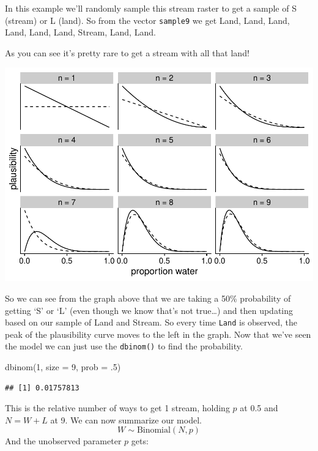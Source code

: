 \documentclass[
]{book}
\newenvironment{Shaded}{\begin{snugshade}}{\end{snugshade}}
\newcommand{\AttributeTok}[1]{\textcolor[rgb]{0.77,0.63,0.00}{#1}}
\newcommand{\DecValTok}[1]{\textcolor[rgb]{0.00,0.00,0.81}{#1}}
\newcommand{\FunctionTok}[1]{\textcolor[rgb]{0.00,0.00,0.00}{#1}}
\newcommand{\NormalTok}[1]{#1}
\begin{document}
In this example we'll randomly sample this stream raster to get a sample of S (stream) or L (land). So from the vector \texttt{sample9} we get Land, Land, Land, Land, Land, Land, Stream, Land, Land.

As you can see it's pretty rare to get a stream with all that land!

\includegraphics{bookdown-demo_files/figure-latex/unnamed-chunk-2-1.pdf}

So we can see from the graph above that we are taking a 50\% probability of getting `S' or `L' (even though we know that's not true\ldots) and then updating based on our sample of Land and Stream. So every time \texttt{Land} is observed, the peak of the plausibility curve moves to the left in the graph. Now that we've seen the model we can just use the \texttt{dbinom()} to find the probability.

\begin{Shaded}
\begin{Highlighting}[]
\FunctionTok{dbinom}\NormalTok{(}\DecValTok{1}\NormalTok{, }\AttributeTok{size =} \DecValTok{9}\NormalTok{, }\AttributeTok{prob =}\NormalTok{ .}\DecValTok{5}\NormalTok{)}
\end{Highlighting}
\end{Shaded}

\begin{verbatim}
## [1] 0.01757813
\end{verbatim}

This is the relative number of ways to get 1 stream, holding \(p\) at 0.5 and \(N = W+L\) at 9. We can now summarize our model.\\

\[
W \sim \text{Binomial}(N,p)
\]
And the unobserved parameter \(p\) gets:
\end{document}
